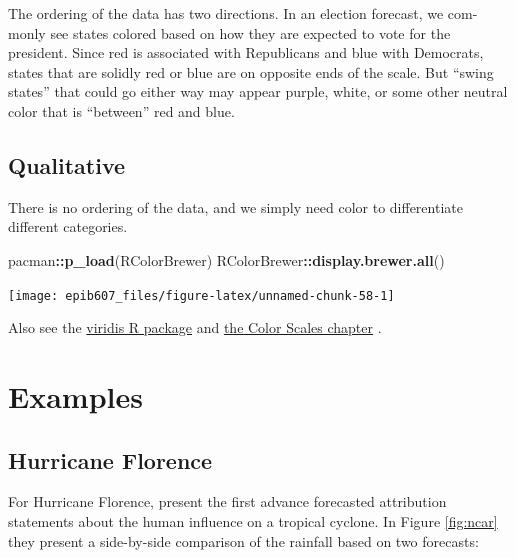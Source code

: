 \documentclass[]{book}
\makeatletter
\newenvironment{Shaded}{\begin{snugshade}}{\end{snugshade}}
\newcommand{\KeywordTok}[1]{\textcolor[rgb]{0.13,0.29,0.53}{\textbf{#1}}}
\newcommand{\OperatorTok}[1]{\textcolor[rgb]{0.81,0.36,0.00}{\textbf{#1}}}
\newcommand{\NormalTok}[1]{#1}
\newenvironment{kframe}{%
\medskip{}
\setlength{\fboxsep}{.8em}
 \def\at@end@of@kframe{}%
 \ifinner\ifhmode%
  \def\at@end@of@kframe{\end{minipage}}%
  \begin{minipage}{\columnwidth}%
 \fi\fi%
 \def\FrameCommand##1{\hskip\@totalleftmargin \hskip-\fboxsep
 \colorbox{shadecolor}{##1}\hskip-\fboxsep
     \hskip-\linewidth \hskip-\@totalleftmargin \hskip\columnwidth}%
 \MakeFramed {\advance\hsize-\width
   \@totalleftmargin\z@ \linewidth\hsize
   \@setminipage}}%
 {\par\unskip\endMakeFramed%
 \at@end@of@kframe}
\renewenvironment{Shaded}{\begin{kframe}}{\end{kframe}}
\theoremstyle{definition}
\theoremstyle{definition}
\theoremstyle{definition}
\theoremstyle{remark}
\makeatother
\begin{document}
The ordering of the data has two directions. In an election forecast, we
com- monly see states colored based on how they are expected to vote for
the president. Since red is associated with Republicans and blue with
Democrats, states that are solidly red or blue are on opposite ends of
the scale. But ``swing states'' that could go either way may appear
purple, white, or some other neutral color that is ``between'' red and
blue.

\subsection{Qualitative}\label{qualitative}

There is no ordering of the data, and we simply need color to
differentiate different categories.

\begin{Shaded}
\begin{Highlighting}[]
\NormalTok{pacman}\OperatorTok{::}\KeywordTok{p_load}\NormalTok{(RColorBrewer)}
\NormalTok{RColorBrewer}\OperatorTok{::}\KeywordTok{display.brewer.all}\NormalTok{()}
\end{Highlighting}
\end{Shaded}

\begin{center}\texttt{[image: epib607\_files/figure-latex/unnamed-chunk-58-1]} \end{center}

Also see the
\href{https://cran.r-project.org/web/packages/viridis/vignettes/intro-to-viridis.html}{viridis
R package} and
\href{https://serialmentor.com/dataviz/color-basics.html}{the Color
Scales chapter} \citep{wilke}.

\section{Examples}\label{examples}

\subsection{Hurricane Florence}\label{hurricane-florence}

For Hurricane Florence, \citet{ncar} present the first advance
forecasted attribution statements about the human influence on a
tropical cyclone. In Figure \ref{fig:ncar} they present a side-by-side
comparison of the rainfall based on two forecasts:
\end{document}

